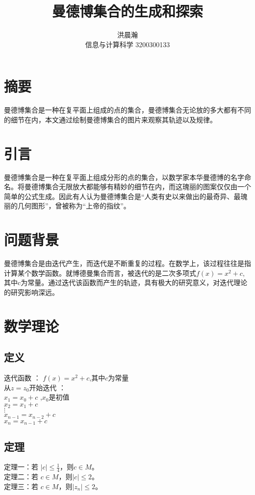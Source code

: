 \documentclass{ctexart}
\title{曼德博集合的生成和探索}
\author{洪晨瀚 \\ 信息与计算科学 3200300133}
\begin{document}
\maketitle

\graphicspath{{image/}}


\section{摘要}
  曼德博集合是一种在复平面上组成的点的集合，曼德博集合无论放的多大都有不同的细节在内，本文通过绘制曼德博集合的图片来观察其轨迹以及规律。

\section{引言}
曼德博集合是一种在复平面上组成分形的点的集合，以数学家本华曼德博的名字命名。将曼德博集合无限放大都能够有精妙的细节在内，而这瑰丽的图案仅仅由一个简单的公式生成。因此有人认为曼德博集合是``人类有史以来做出的最奇异、最瑰丽的几何图形''，曾被称为``上帝的指纹''。 \cite{branner1989mandelbrot}

\section{问题背景}
曼德博集合是由迭代产生，而迭代是不断重复的过程。在数学上，该过程往往是指计算某个数学函数。就博德曼集合而言，被迭代的是二次多项式$f(x)=x^2+c$,其中c为常量。通过迭代该函数而产生的轨迹，具有极大的研究意义，对迭代理论的研究影响深远。 \cite{shishikura1998hausdorff}

\section{数学理论}
\subsection{定义}
\begin{flushleft}
  迭代函数 ： $f(x)=x^2+c$,其中$c$为常量\\
  从$z=z_0$开始迭代 ：  \\
  $x_1=x_0+c$ ,$x_0$是初值 \\
  $x_2=x_1+c$ \\
  $\vdots$ \\
  $x_{n-1}=x_{n-2}+c$ \\
  $x_n=x_{n-1}+c$
\end{flushleft}

\subsection{定理}
\begin{flushleft}
  定理一：若 $|c| \leq \frac{1}{4}$，则$c \in M$。 \\
  定理二：若 $c \in M$，则$|c| \leq 2$。 \\
  定理三：若 $c \in M$，则$|z_{n}| \leq 2$。 
\end{flushleft}
\end{document}
